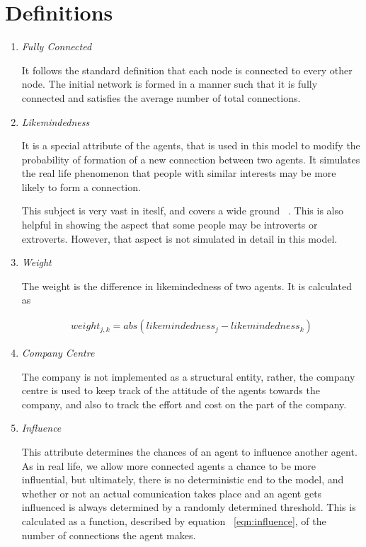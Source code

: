 \section{Definitions}
\begin{enumerate}
\item \emph{Fully Connected}

It follows the standard definition that each node is connected to every other node. The initial network is formed in a manner such that it is fully connected and satisfies the average number of total connections.

\item \emph{Likemindedness}

It is a special attribute of the agents, that is used in this model to modify the probability of formation of a new connection between two agents. It simulates the real life phenomenon that people with similar interests may be more likely to form a connection. 

This subject is very vast in iteslf, and covers a wide ground ~\cite{jung1921question, Wilt08extraversion}. This is also helpful in showing the aspect that some people may be introverts or extroverts. However, that aspect is not simulated in detail in this model.

\item \emph{Weight}

The weight is the difference in likemindedness of two agents. It is calculated as 

\begin{eqnarray}
weight_{j,k} = abs( likemindedness_{j} - likemindedness_{k} )
\label{eqn:weight}
\end{eqnarray}

\item \emph{Company Centre}

The company is not implemented as a structural entity, rather, the company centre is used to keep track of the attitude of the agents towards the company, and also to track the effort and cost on the part of the company.

\item \emph{Influence}

This attribute determines the chances of an agent to influence another agent. As in real life, we allow more connected agents a chance to be more influential, but ultimately, there is no deterministic end to the model, and whether or not an actual comunication takes place and an agent gets influenced is always determined by a randomly determined threshold. 
This is calculated as a function, described by equation ~\ref{eqn:influence}, of the number of connections the agent makes.


\end{enumerate}
